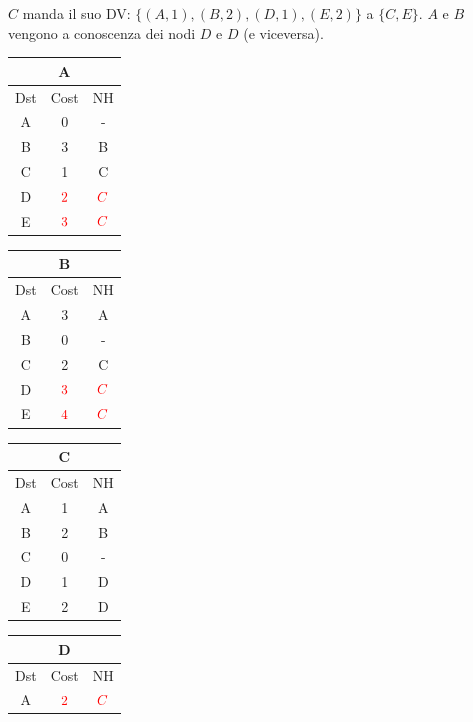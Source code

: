 \documentclass[10pt]{article}
\begin{document}
			\newline \newline
			$C$ manda il suo DV: $\{(A,1),(B,2),(D,1),(E,2)\}$ a $\{C,E\}$.
			\newline
			$A$ e $B$ vengono a conoscenza dei nodi $D$ e $D$ (e viceversa).
			\begin{table}[h!]
				\begin{tabular}{|c||c||c|}
					\hline
					\multicolumn{3}{|c|}{A} \\
					\hline
					Dst & Cost & NH \\
					\hline
					A & 0 & - \\
					B & 3 & B \\
					C & 1 & C \\
					D & $\color{red} 2$ & $\color{red} C$ \\
					E & $\color{red} 3$ & $\color{red} C$ \\
					\hline
				\end{tabular}
				\begin{tabular}{|c||c||c|}
					\hline
					\multicolumn{3}{|c|}{B} \\
					\hline
					Dst & Cost & NH \\
					\hline
					A & 3 & A \\
					B & 0 & - \\
					C & 2 & C  \\
					D & $\color{red} 3$ & $\color{red} C$ \\
					E & $\color{red} 4$ & $\color{red} C$ \\
					\hline
				\end{tabular}
				\begin{tabular}{|c||c||c|}
					\hline
					\multicolumn{3}{|c|}{C} \\
					\hline
					Dst & Cost & NH \\
					\hline
					A & 1 & A \\
					B & 2 & B \\
					C & 0 & - \\
					D & 1 & D \\
					E & 2 & D \\
					\hline
				\end{tabular}
				\begin{tabular}{|c||c||c|}
					\hline
					\multicolumn{3}{|c|}{D} \\
					\hline
					Dst & Cost & NH \\
					\hline
					A & $\color{red} 2$ & $\color{red} C$ \\

\end{tabular}
\end{table}
\end{document}
